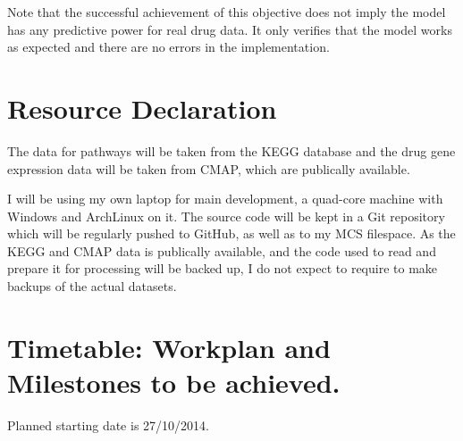 \documentclass[12pt,a4]{article}
\begin{document}
Note that the successful achievement of this objective does not imply the model has any predictive power for real drug data. It only verifies that the model works as expected and there are no errors in the implementation.

\section*{Resource Declaration}

The data for pathways will be taken from the KEGG database and the drug gene expression data will be taken from CMAP, which are publically available.

I will be using my own laptop for main development, a quad-core machine with Windows and ArchLinux on it. The source code will be kept in a Git repository which will be regularly pushed to GitHub, as well as to my MCS filespace. As the KEGG and CMAP data is publically available, and the code used to read and prepare it for processing will be backed up, I do not expect to require to make backups of the actual datasets.

\section*{Timetable: Workplan and Milestones to be achieved.}

Planned starting date is 27/10/2014.
\end{document}
